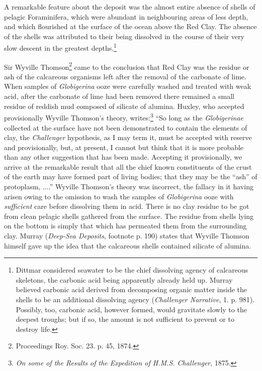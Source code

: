 \documentclass[a4paper, 12pt, oneside]{article}
\begin{document}
A remarkable feature about the deposit was the almost entire absence of shells of pelagic Foraminifera, which were abundant in neighbouring areas of less depth, and which flourished at the surface of the ocean above the Red Clay. The absence of the shells was attributed to their being dissolved in the course of their very slow descent in the greatest depths.\footnote{Dittmar considered seawater to be the chief dissolving agency of calcareous skeletons, the carbonic acid being apparently already held up. Murray believed carbonic acid derived from decomposing organic matter inside the shells to be an additional dissolving agency (\emph{Challenger Narrative}, 1. p. 981). Possibly, too, carbonic acid, however formed, would gravitate slowly to the deepest troughs; but if so, the amount is not sufficient to prevent or to destroy life.}

Sir Wyville Thomson\footnote{Proceedings Roy. Soc. 23. p. 45, 1874.} came to the conclusion that Red Clay was the residue or ash of the calcareous organisms left after the removal of the carbonate of lime. When samples of \emph{Globigerina} ooze were carefully washed and treated with weak acid, after the carbonate of lime had been removed there remained a small residue of reddish mud composed of silicate of alumina. Huxley, who accepted provisionally Wyville Thomson's theory, writes:\footnote{\emph{On some of the Results of the Expedition of H.M.S. Challenger}, 1875.} ``So long as the \emph{Globigerinae} collected at the surface have not been demonstrated to contain the elements of clay, the \emph{Challenger} hypothesis, as I may term it, must be accepted with reserve and provisionally, but, at present, I cannot but think that it is more probable than any other suggestion that has been made. Accepting it provisionally, we arrive at the remarkable result that all the chief known constituents of the crust of the earth may have formed part of living bodies; that they may be the ``ash'' of protoplasm, ....'' Wyville Thomson's theory was incorrect, the fallacy in it having arisen owing to the omission to wash the samples of \emph{Globigerina} ooze with \emph{sufficient} care before dissolving them in acid. There is no clay residue to be got from clean pelagic shells gathered from the surface. The residue from shells lying on the bottom is simply that which has permeated them from the surrounding clay. Murray (\emph{Deep-Sea Deposits}, footnote p. 190) states that Wyville Thomson himself gave up the idea that the calcareous shells contained silicate of alumina.
\end{document}
